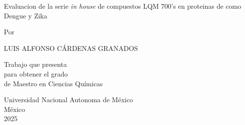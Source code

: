 \begin{titlepage}
    \begin{center}
            
       

        \large
        {Evaluacion de la serie \textit{in house} de compuestos LQM 700's en proteinas de  como Dengue y Zika  }

        \vspace{1.5cm}

        Por
            
        \vspace{1.5cm}
            
        \large{\uppercase{Luis Alfonso Cárdenas Granados}}
            
        \vspace{1.5cm}
            
        \normalsize Trabajo que presenta  \\
        para obtener el grado  \\
        de Maestro en Ciencias Químicas
            
        \vspace{1.0cm}
            
            
        
        Universidad Nacional Autonoma de México\\
        México\\
        2025
            
    \end{center}
\end{titlepage}